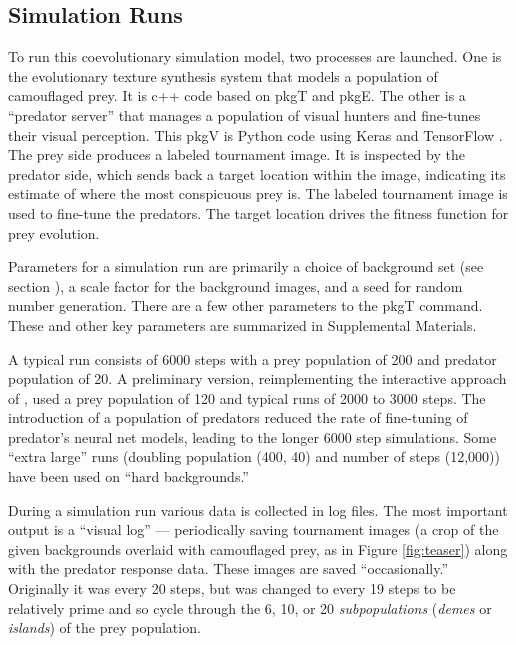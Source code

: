 \documentclass[letterpaper]{article}
\newcommand{\jargon}[1]{\textit{#1}}
\newcommand{\texsyn}[0]{pkgT}
\newcommand{\lazypredator}[0]{pkgE}
\newcommand{\predatoreye}[0]{pkgV}
\begin{document}
\subsection{Simulation Runs}
To run this coevolutionary simulation model, two processes are launched. One is the evolutionary texture synthesis system that models a population of camouflaged prey. It is c++ code based on \texsyn{} and \lazypredator{}. The other is a “predator server” that manages a population of visual hunters and fine-tunes their visual perception. This \predatoreye{} is Python code using Keras \cite{chollet_keras_2015} and TensorFlow \cite{tensorflow_whitepaper_2015}. The prey side produces a labeled tournament image. It is inspected by the predator side, which sends back a target location within the image, indicating its estimate of where the most conspicuous prey is. The labeled tournament image is used to fine-tune the predators. The target location drives the fitness function for prey evolution.
\par
Parameters for a simulation run are primarily a choice of background set (see section ), a scale factor for the background images, and a seed for random number generation. There are a few other parameters to the \texsyn{} command. These and other key parameters are summarized in Supplemental Materials.
\par
A typical run consists of 6000 steps with a prey population of 200 and predator population of 20. A preliminary version, reimplementing the interactive approach of \citet{reynolds_iec_2011}, used a prey population of 120 and typical runs of 2000 to 3000 steps. The introduction of a population of predators reduced the rate of fine-tuning of predator's neural net models, leading to the longer 6000 step simulations. Some “extra large” runs (doubling population (400, 40) and number of steps (12,000)) have been used on “hard backgrounds.”
\par
During a simulation run various data is collected in log files. The most important output is a “visual log” — periodically saving tournament images (a crop of the given backgrounds overlaid with camouflaged prey, as in Figure \ref{fig:teaser}) along with the predator response data. These images are saved “occasionally.” Originally it was every 20 steps, but was changed to every 19 steps to be relatively prime and so cycle through the 6, 10, or 20 \jargon{subpopulations} (\jargon{demes} or \jargon{islands}) of the prey population.
\par
\end{document}
